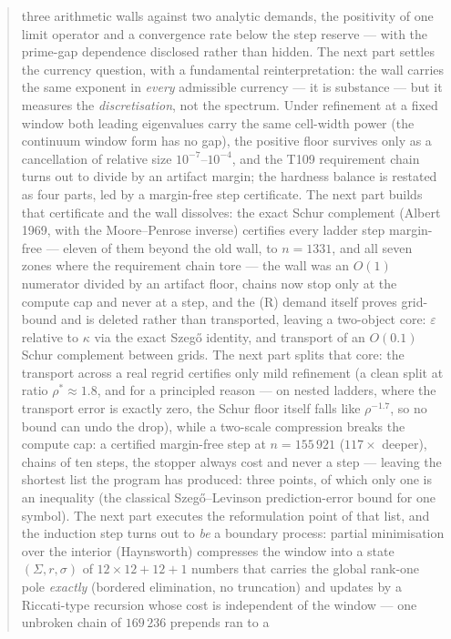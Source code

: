 \documentclass[11pt,a4paper]{article}
\begin{document}
\begin{abstract}
three arithmetic walls against two analytic demands, the positivity of one limit operator and a
convergence rate below the step reserve --- with the prime-gap dependence disclosed rather than
hidden. The next part settles the currency question, with a fundamental reinterpretation: the wall
carries the same exponent in \emph{every} admissible currency --- it is substance --- but it
measures the \emph{discretisation}, not the spectrum. Under refinement at a fixed window both
leading eigenvalues carry the same cell-width power (the continuum window form has no gap), the
positive floor survives only as a cancellation of relative size $10^{-7}$--$10^{-4}$, and the T109
requirement chain turns out to divide by an artifact margin; the hardness balance is restated as
four parts, led by a margin-free step certificate. The next part builds that certificate and the
wall dissolves: the exact Schur complement (Albert 1969, with the Moore--Penrose inverse)
certifies every ladder step margin-free --- eleven of them beyond the old wall, to $n=1331$, and
all seven zones where the requirement chain tore --- the wall was an $O(1)$ numerator divided by
an artifact floor, chains now stop only at the compute cap and never at a step, and the (R)
demand itself proves grid-bound and is deleted rather than transported, leaving a two-object
core: $\varepsilon$ relative to $\kappa$ via the exact Szeg\H{o} identity, and transport of an
$O(0.1)$ Schur complement between grids. The next part splits that core: the transport across a
real regrid certifies only mild refinement (a clean split at ratio $\rho^*\approx1.8$, and for a
principled reason --- on nested ladders, where the transport error is exactly zero, the Schur
floor itself falls like $\rho^{-1.7}$, so no bound can undo the drop), while a two-scale
compression breaks the compute cap: a certified margin-free step at $n=155\,921$ ($117\times$
deeper), chains of ten steps, the stopper always cost and never a step --- leaving the shortest
list the program has produced: three points, of which only one is an inequality (the classical
Szeg\H{o}--Levinson prediction-error bound for one symbol). The next part executes the
reformulation point of that list, and the induction step turns out to \emph{be} a boundary
process: partial minimisation over the interior (Haynsworth) compresses the window into a state
$(\Sigma,r,\sigma)$ of $12\times12+12+1$ numbers that carries the global rank-one pole
\emph{exactly} (bordered elimination, no truncation) and updates by a Riccati-type recursion
whose cost is independent of the window --- one unbroken chain of $169\,236$ prepends ran to a

\end{abstract}
\end{document}
